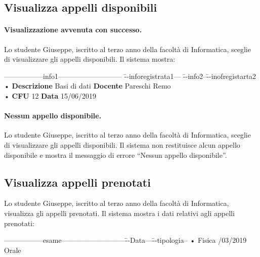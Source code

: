 \subsection{Visualizza appelli disponibili}
\paragraph{Visualizzazione avvenuta con successo.}
Lo studente Giuseppe, iscritto al terzo anno della facoltà di Informatica, sceglie di visualizzare gli appelli disponibili. Il sistema mostra:

 \begin{tabbing}
	\hspace{1cm}-----------------info1--------------------------- \= --inforegistrata1--- \= --info2--\=--inofregistarta2 \kill
	\hspace{1cm} • \textbf{Descrizione} Basi di dati \> \textbf{Docente} Pareschi Remo
	  \\
	\hspace{1cm} •  \textbf{CFU} 12  \> \textbf{Data} 15/06/2019 \\
\end{tabbing}

\paragraph{Nessun appello disponibile.}
Lo studente Giuseppe, iscritto al terzo anno della facoltà di Informatica, sceglie di visualizzare gli appelli disponibili. Il sistema non restituisce alcun appello disponibile e mostra il messaggio di errore “Nessun appello disponibile”.

\subsection{Visualizza appelli prenotati}
Lo studente Giuseppe, iscritto al terzo anno della facoltà di Informatica, visualizza gli appelli prenotati. Il sistema mostra i dati relativi agli appelli prenotati: 

 \begin{tabbing}
	\hspace{1cm}-----------------esame---------------------------\=--Data---\= --tipologia--\kill
	\hspace{1cm} • Fisica /03/2019 \> Orale \\
\end{tabbing}





